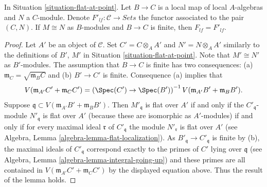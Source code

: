 \begin{lemma}
\label{lemma-flat-at-point-finite}
In Situation \ref{situation-flat-at-point}. Let $B \to C$ is a local map of
local $A$-algebras and $N$ a $C$-module. Denote
$F'_{lf} : \mathcal{C} \to \textit{Sets}$ the functor associated to the pair
$(C, N)$. If $M \cong N$ as $B$-modules and $B \to C$ is finite, then
$F_{lf} = F'_{lf}$.
\end{lemma}

\begin{proof}
Let $A'$ be an object of $\mathcal{C}$. Set $C' = C \otimes_A A'$
and $N' = N \otimes_A A'$ similarly to the definitions of $B'$, $M'$ in
Situation \ref{situation-flat-at-point}.
Note that $M' \cong N'$ as $B'$-modules.
The assumption that $B \to C$ is finite has two consequences:
(a) $\mathfrak m_C = \sqrt{\mathfrak m_B C}$ and (b)
$B' \to C'$ is finite. Consequence (a) implies that
$$
V(\mathfrak m_{A'}C' + \mathfrak m_C C')
=
\left(
\Spec(C') \to \Spec(B')
\right)^{-1}V(\mathfrak m_{A'}B' + \mathfrak m_B B').
$$
Suppose $\mathfrak q \subset V(\mathfrak m_{A'}B' + \mathfrak m_B B')$.
Then $M'_{\mathfrak q}$ is flat over $A'$ if and only if
the $C'_{\mathfrak q}$-module $N'_{\mathfrak q}$ is flat over $A'$
(because these are isomorphic as $A'$-modules) if and only if
for every maximal ideal $\mathfrak r$ of $C'_{\mathfrak q}$
the module $N'_{\mathfrak r}$ is flat over $A'$ (see
Algebra, Lemma \ref{algebra-lemma-flat-localization}).
As $B'_{\mathfrak q} \to C'_{\mathfrak q}$ is finite by (b),
the maximal ideals of $C'_{\mathfrak q}$ correspond exactly
to the primes of $C'$ lying over $\mathfrak q$ (see
Algebra, Lemma \ref{algebra-lemma-integral-going-up})
and these primes are all contained in
$V(\mathfrak m_{A'}C' + \mathfrak m_C C')$ by
the displayed equation above. Thus the result of the lemma holds.
\end{proof}
